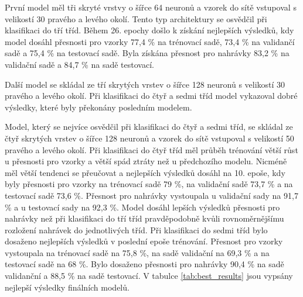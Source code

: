 \documentclass[FM,BP]{tulthesis}
\begin{document}
První model měl tři skryté vrstvy o šířce 64 neuronů a vzorek do sítě vstupoval s velikostí 30 pravého a levého okolí. Tento typ architektury se osvědčil při klasifikaci do tří tříd. Během 26. epochy došlo k získání nejlepších výsledků, kdy model dosáhl přesnosti pro vzorky 77,4 \% na trénovací sadě, 73,4 \% na validančí sadě a 75,4 \% na testovací sadě. Byla získána přesnost pro nahrávky 83,2 \% na validační sadě a 84,7 \% na sadě testovací.

Další model se skládal ze tří skrytých vrstev o šířce 128 neuronů s velikostí 30 pravého a levého okolí. Při klasifikaci do čtyř a sedmi tříd model vykazoval dobré výsledky, které byly překonány posledním modelem.

Model, který se nejvíce osvědčil při klasifikaci do čtyř a sedmi tříd, se skládal ze čtyř skrytých vrstev o šířce 128 neuronů a vzorek do sítě vstupoval s velikostí 50 pravého a levého okolí. Při klasifikaci do čtyř tříd měl průběh trénování větší růst u přesnosti pro vzorky a větší spád ztráty než u předchozího modelu. Nicméně měl větší tendenci se přeučovat a nejlepších výsledků dosáhl na 10. epoše, kdy byly přesnosti pro vzorky na trénovací sadě 79 \%, na validační sadě 73,7 \% a na testovací sadě 73,6 \%. Přesnost pro nahrávky vystoupala u validační sady na 91,7 \% a u testovací sady na 92,3 \%. Model dosáhl lepších výsledků přesnosti pro nahrávky než při klasifikaci do tří tříd pravděpodobně kvůli rovnoměrnějšímu rozložení nahrávek do jednotlivých tříd. Při klasifikaci do sedmi tříd bylo dosaženo nejlepších výsledků v poslední epoše trénování. Přesnost pro vzorky vystoupala na trénovací sadě na 75,8 \%, na sadě validační na 69,3 \% a na testovací sadě na 68 \%. Bylo dosaženo přesnosti pro nahrávky 90,4 \% na sadě validanční a 88,5 \% na sadě testovací. V tabulce \ref{tab:best_results} jsou vypsány nejlepší výsledky finálních modelů.

\begin{table}[htb]
\centering
{}
\caption{Přehled nejlepších výsledků finálních modelů}
\label{tab:best_results}
\end{table}
\FloatBarrier
\end{document}
